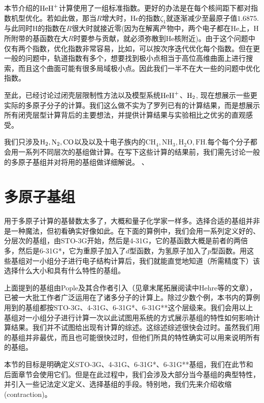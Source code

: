 {本节介绍的$\mathrm{HeH}^+$计算使用了一组标准指数。更好的办法是在每个核间距下都对指数机型优化。若如此做，那当$R$增大时，$\text{He}$的指数$\zeta_1$就逐渐减少至最原子值$1.6875$. 与此同时$\text{H}$的指数在$R$很大时就接近零(因为在解离产物中，两个电子都在$\text{He}$上，$\text{H}$所附带的基函数在大$R$时要参与贡献，就必须弥散到$\text{He}$核附近)。由于这个问题中仅有两个指数，优化指数非常容易，比如，可以按次序迭代优化每个指数。但在更一般的问题中，轨道指数有多个，想要找到极小点相当于高位高维曲面上进行搜索，而且这个曲面可能有很多局域极小点。因此我们一半不在大一些的问题中优化指数。

至此，已经讨论过闭壳层限制性\hft 方法以及模型系统$\mathrm{HeH}^+$、$\mathrm{H}_2$, 现在想展示一些更实际的多原子分子的计算。我们这么做不实为了罗列已有的计算结果，而是想展示所有闭壳层\hft 型计算背后的主要想法，并提供计算结果与实验相比之优劣的直观感受。

我们只涉及$\mathrm{H}_2, \text{N}_2, \text{CO}$以及以及十电子族内的$\text{CH}_4, \text{NH}_3, \text{H}_2\text{O}, \text{FH}$.每个每个分子都会用一系列不同层次的基组做计算。在写下这些计算的结果前，我们需先讨论一般的多原子基组并对将用的基组做详细解说。
、
\section{多原子基组}
用于多原子计算的基替数太多了，大概和量子化学家一样多。选择合适的基组并非是一种魔法，但初看确实好像如此。在下面的算例中，我们会用一系列定义好的、分层次的基组，由STO-3G开始，然后是4-31G，它的基函数大概是前者的两倍多，然后是6-31G*，它为重原子加入了$d$型函数，为氢原子加入了$p$型函数。用这些基组对一小组分子进行电子结构计算后，我们就能直觉地知道（所需精度下）该选择什么大小和具有什么特性的基组。

上面提到的基组由Pople及其合作者引入（见章末尾拓展阅读中Hehre等的文章），已被一大批工作者广泛运用在了诸多分子的计算上。除过少数个例，本书内的算例用到的基组都按STO-3G、4-31G、6-31G*、6-31G**这个层级来。我们会用以上基组对一小组分子进行计算一次以此试图用系统的方式展示基组的特性如何影响计算结果。我们并不试图给出现有计算的综述。这综述综述很快会过时。虽然我们用的基组并非最优，而且也可能很快过时，但他们所具的特性确实可以用来说明所有的基组。

本节的目标是明确定义STO-3G、4-31G、6-31G*、6-31G**基组，我们在此节和后面章节会使用它们。但是在此过程中，我们会涉及大部分当今基组的典型特性，并引入一些记法定义定义、选择基组的手段。特别地，我们先来介绍收缩(contraction)。
}
